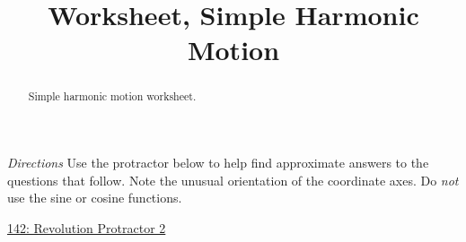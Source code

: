 \documentclass{ximera}
\title{Worksheet, Simple Harmonic Motion}
\begin{document}
\begin{abstract}
Simple harmonic motion worksheet.
\end{abstract}
\maketitle

\emph{Directions} Use the protractor below to help find approximate answers to the questions that follow. Note the unusual orientation of the coordinate axes. Do \emph{not} use the sine or cosine functions.


\begin{onlineOnly}
    \begin{center}
\end{center}
\end{onlineOnly}

\href{https://www.desmos.com/calculator/9xuhmux5qr}{142: Revolution Protractor 2}
\end{document}
